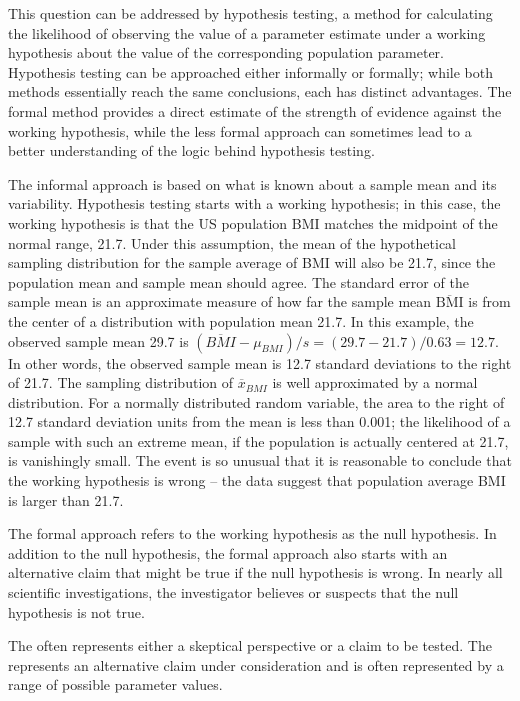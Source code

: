 \begin{spacing}{1.5}
This question can be addressed by hypothesis testing, a method for calculating the likelihood of observing the value of a parameter estimate under a working hypothesis about the value of the corresponding population parameter. Hypothesis testing can be approached either informally or formally; while both methods essentially reach the same conclusions, each has distinct advantages. The formal method provides a direct estimate of the strength of evidence against the working hypothesis, while the less formal approach can sometimes lead to a better understanding of the logic behind hypothesis testing.

The informal approach is based on what is known about a sample mean and its variability. Hypothesis testing starts with a working hypothesis; in this case, the working hypothesis is that the US population BMI matches the midpoint of the normal range, 21.7. Under this assumption, the mean of the hypothetical sampling distribution for the sample average of BMI will also be 21.7, since the population mean and sample mean should agree. The standard error of the sample mean is an approximate measure of how far the sample mean $\overline{\text{BMI}}$ is from the center of a distribution with population mean 21.7. In this example, the observed sample mean 29.7 is $(\overline{BMI} - \mu_{BMI})/s =  (29.7 - 21.7)/0.63 = 12.7$. In other words, the observed sample mean is 12.7 standard deviations to the right of 21.7. The sampling distribution of $\overline{x}_{BMI}$ is well approximated by a normal distribution. For a normally distributed random variable, the area to the right of 12.7 standard deviation units from the mean is less than 0.001; the likelihood of a sample with such an extreme mean, if the population is actually centered at 21.7, is vanishingly small. The event is so unusual that it is reasonable to conclude that the working hypothesis is wrong -- the data suggest that population average BMI is larger than 21.7.

The formal approach refers to the working hypothesis as the null hypothesis. In addition to the null hypothesis, the formal approach also starts with an alternative claim that might be true if the null hypothesis is wrong. In nearly all scientific investigations, the investigator believes or suspects that the null hypothesis is not true. 

\begin{termBox}{
{The  often represents either a skeptical perspective or a claim to be tested. The  represents an alternative claim under consideration and is often represented by a range of possible parameter values.}}
\end{termBox}


\end{spacing}
